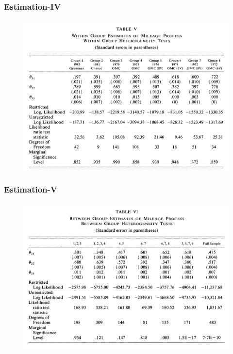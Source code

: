 \documentclass{beamer}
\begin{document}
\begin{frame}
\frametitle{Estimation-IV}
\begin{center}
\begin{figure}[h!]
\includegraphics[scale =0.5]{t5.png}
\end{figure}
\end{center}
\end{frame}
\begin{frame}
\frametitle{Estimation-V}
\begin{center}
\begin{figure}[h!]
\includegraphics[scale =0.5]{t6.png}
\end{figure}
\end{center}
\end{frame}
\end{document}

